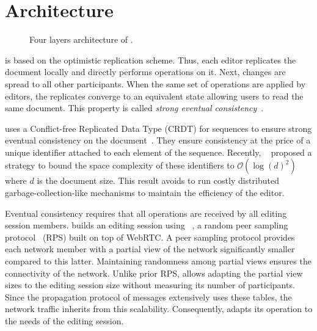 
\section{Architecture}
\label{sec:architecture}

\begin{figure}
  \centering
  
  \caption{\label{fig:architecture} Four layers architecture of \CRATE.}
\end{figure}

\CRATE is based on the optimistic replication scheme. Thus, each editor
replicates the document locally and directly performs operations on it. Next,
changes are spread to all other participants. When the same set of operations
are applied by editors, the replicates converge to an equivalent state allowing
users to read the same document.  This property is called \emph{strong eventual
  consistency}~\cite{bailis2013eventual}.

\CRATE uses a Conflict-free Replicated Data Type (CRDT) for sequences to ensure
strong eventual consistency on the
document~\cite{shapiro2011comprehensive}. They ensure consistency at the price
of a unique identifier attached to each element of the sequence. Recently,
\LSEQ~\cite{nedelec2013lseq} proposed a strategy to bound the space complexity
of these identifiers to $\mathcal{O}(\log(d)^2)$ where $d$ is the document
size. This result avoids to run costly distributed garbage-collection-like
mechanisms to maintain the efficiency of the editor.

Eventual consistency requires that all operations are received by all editing
session members.  \CRATE builds an editing session using
\SPRAY~\cite{nedelec2015spray}, a random peer sampling
protocol~\cite{jelasity2007gossip} (RPS) built on top of WebRTC. A peer sampling
protocol provides each network member with a partial view of the network
significantly smaller compared to this latter. Maintaining randomness among
partial views ensures the connectivity of the network. Unlike prior RPS, \SPRAY
allows adapting the partial view sizes to the editing session size without
measuring its number of participants. Since the propagation protocol of messages
extensively uses these tables, the network traffic inherits from this
scalability. Consequently, \CRATE adapts its operation to the needs of the
editing session.


